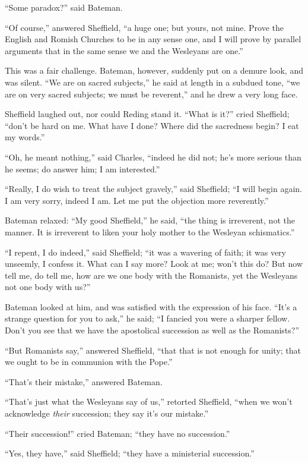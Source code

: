 ``Some paradox?'' said Bateman.

``Of course,'' answered Sheffield, ``a huge one; but
yours, not mine. Prove the English and Romish Churches to be in any
sense one, and I will prove by parallel arguments that in the same
sense we and the Wesleyans are one.''

This was a fair challenge. Bateman, however, suddenly put on a
demure look, and was silent. ``We are on sacred subjects,'' he
said at length in a subdued tone, ``we are on very sacred
subjects; we must be reverent,'' and he drew a very long face.

Sheffield laughed out, nor could Reding stand it. ``What is
it?'' cried Sheffield; ``don't be hard on me. What have I
done? Where did the sacredness begin? I eat my words.''

``Oh, he meant nothing,'' said Charles, ``indeed he did
not; he's more serious than he seems; do answer him; I am
interested.''

``Really, I do wish to treat the subject gravely,'' said
Sheffield; ``I will begin again. I am very sorry, indeed I am. Let
me put the objection more reverently.''

Bateman relaxed: ``My good Sheffield,'' he said, ``the
thing is irreverent, not the manner. It is irreverent to liken your
holy mother to the Wesleyan schismatics.''

``I repent, I do indeed,'' said Sheffield; ``it was a
wavering of faith; it was very unseemly, I confess it. What can I say
more? Look at me; won't this do? But now tell me, do tell me, how are
we one body with the Romanists, yet the Wesleyans not one body with
us?''

Bateman looked at him, and was satisfied with the expression of his
face. ``It's a strange question for you to ask,'' he said;
``I fancied you were a sharper fellow. Don't you see that we have
the apostolical succession as well as the Romanists?''

``But Romanists say,'' answered Sheffield, ``that that
is not enough for unity; that we ought to be in communion with the
Pope.''

``That's their mistake,'' answered Bateman.

``That's just what the Wesleyans say of us,'' retorted
Sheffield, ``when we won't acknowledge \emph{their} succession;
they say it's our mistake.''

``Their succession!'' cried Bateman; ``they have no
succession.''

``Yes, they have,'' said Sheffield; ``they have a
ministerial succession.''

